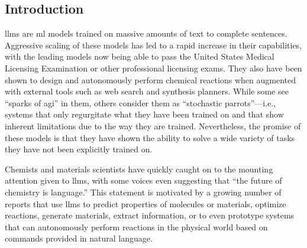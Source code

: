 \documentclass[11pt, oneside]{article}
\begin{document}
\clearpage
\begin{refsection}
\section{Introduction}
\Glspl{llm} are \gls{ml} models trained on massive amounts of text to complete sentences.
Aggressive scaling of these models has led to a rapid increase in their capabilities,\autocite{brown2020language,zhong2024benchmarking} with the leading models now being able to pass the United States Medical Licensing Examination\autocite{kung2023performance} or other professional licensing exams.
They also have been shown to design and autonomously perform chemical reactions when augmented with external tools such as web search and synthesis planners.\autocite{openai2024gpt4, Boiko_2023, bran2023chemcrow, darvish2024organa}
While some see \enquote{sparks of \gls{agi}} in them,\autocite{bubeck2023sparks} others consider them as \enquote{stochastic parrots}---i.e., systems that only regurgitate what they have been trained on\autocite{bender2021dangers} and that show inherent limitations due to the way they are trained.\autocite{mccoy2023embersautoregressionunderstandinglarge}
Nevertheless, the promise of these models is that they have shown the ability to solve a wide variety of tasks they have not been explicitly trained on.\autocite{bommasani2021opportunities, anderljung2023frontier, ai4science2023impact}

Chemists and materials scientists have quickly caught on to the mounting attention given to \glspl{llm}, with some voices even suggesting that \enquote{the future of chemistry is language.}\autocite{White_2023}
This statement is motivated by a growing number of reports that use \glspl{llm} to predict properties of molecules or materials,\autocite{jablonka202314, jablonka2024leveraging, xie2024fine, liao2024words, zhang2024chemllm, zhong2024benchmarking}  optimize reactions,\autocite{ramos2023bayesian, kristiadi2024sober}  generate materials,\autocite{rubungo2023llm, flam2023language, gruver2024fine, alampara2024mattextlanguagemodelsneed} extract information,\autocite{Patiny_2023, Dagdelen_2024, Zheng_2024, lala2023paperqa, caufield2023structured, gupta2022discomat, schillingwilhelmi2024textinsightlargelanguage, skarlinski2024language} or to even prototype systems that can autonomously perform reactions in the physical world based on commands provided in natural language.\autocite{bran2023chemcrow, Boiko_2023, darvish2024organa}


\end{refsection}
\end{document}
